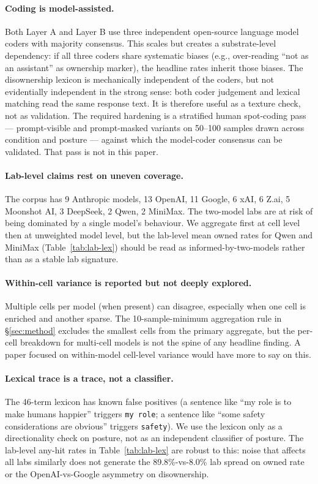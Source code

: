 \paragraph{Coding is model-assisted.}
Both Layer A and Layer B use three independent open-source language model coders with majority consensus. This scales but creates a substrate-level dependency: if all three coders share systematic biases (e.g., over-reading ``not as an assistant'' as ownership marker), the headline rates inherit those biases. The disownership lexicon is mechanically independent of the coders, but not evidentially independent in the strong sense: both coder judgement and lexical matching read the same response text. It is therefore useful as a texture check, not as validation. The required hardening is a stratified human spot-coding pass --- prompt-visible and prompt-masked variants on 50--100 samples drawn across condition and posture --- against which the model-coder consensus can be validated. That pass is not in this paper.

\paragraph{Lab-level claims rest on uneven coverage.}
The corpus has 9 Anthropic models, 13 OpenAI, 11 Google, 6 xAI, 6 Z.ai, 5 Moonshot AI, 3 DeepSeek, 2 Qwen, 2 MiniMax. The two-model labs are at risk of being dominated by a single model's behaviour. We aggregate first at cell level then at unweighted model level, but the lab-level mean owned rates for Qwen and MiniMax (Table~\ref{tab:lab-lex}) should be read as informed-by-two-models rather than as a stable lab signature.

\paragraph{Within-cell variance is reported but not deeply explored.}
Multiple cells per model (when present) can disagree, especially when one cell is enriched and another sparse. The 10-sample-minimum aggregation rule in \S\ref{sec:method} excludes the smallest cells from the primary aggregate, but the per-cell breakdown for multi-cell models is not the spine of any headline finding. A paper focused on within-model cell-level variance would have more to say on this.

\paragraph{Lexical trace is a trace, not a classifier.}
The 46-term lexicon has known false positives (a sentence like ``my role is to make humans happier'' triggers \texttt{my role}; a sentence like ``some safety considerations are obvious'' triggers \texttt{safety}). We use the lexicon only as a directionality check on posture, not as an independent classifier of posture. The lab-level any-hit rates in Table~\ref{tab:lab-lex} are robust to this: noise that affects all labs similarly does not generate the 89.8\%-vs-8.0\% lab spread on owned rate or the OpenAI-vs-Google asymmetry on disownership.

